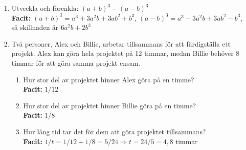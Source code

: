 \documentclass[a4paper,11pt]{article}
\begin{document}
\begin{enumerate}[label=\textbf{\arabic*.}]
    \item Utveckla och förenkla: $(a + b)^3 - (a - b)^3$
    \\ \textbf{Facit:} $(a+b)^3 = a^3 + 3a^2b + 3ab^2 + b^3$, $(a-b)^3 = a^3 - 3a^2b + 3ab^2 - b^3$, så skillnaden är $6a^2b + 2b^3$
    
    \item Två personer, Alex och Billie, arbetar tillsammans för att färdigställa ett projekt. Alex kan göra hela projektet på 12 timmar, medan Billie behöver 8 timmar för att göra samma projekt ensam.
    \begin{enumerate}[label=\alph*)]
        \item Hur stor del av projektet hinner Alex göra på en timme?
        \\ \textbf{Facit:} $1/12$
        \item Hur stor del av projektet hinner Billie göra på en timme?
        \\ \textbf{Facit:} $1/8$
        \item Hur lång tid tar det för dem att göra projektet tillsammans?
        \\ \textbf{Facit:} $1/t = 1/12 + 1/8 = 5/24 \Rightarrow t = 24/5 = 4,8$ timmar
    \end{enumerate}
\end{enumerate}
\end{document}
